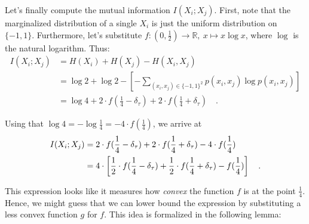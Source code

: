 \documentclass[../../main.tex]{subfiles}
\begin{document}
Let's finally compute the mutual information $I(X_i; X_j)$. First, note that the marginalized distribution of a single $X_i$ is just the uniform distribution on $\{-1, 1\}$. Furthermore, let's substitute $f: (0, \frac{1}{2}) \to \mathbb{R}, \ x \mapsto x \log x$, where $\log$ is the natural logarithm. Thus:
\begin{align*}
    I(X_i; X_j) &= H(X_i) + H(X_j) - H(X_i, X_j) \\
    &= \log 2 + \log 2 - \left[ - \sum_{(x_i, x_j) \in \{-1, 1\}^2} p(x_i, x_j) \log p(x_i, x_j) \right] \\
    &= \log 4 + 2 \cdot f(\frac{1}{4} - \delta_\tau) + 2 \cdot f(\frac{1}{4} + \delta_\tau) \quad .
\end{align*}

Using that $\log 4 = - \log \frac{1}{4} = -4 \cdot f(\frac{1}{4})$, we arrive at
\begin{align}
    I(X_i; X_j) &= 2 \cdot f(\frac{1}{4} - \delta_\tau) + 2 \cdot f(\frac{1}{4} + \delta_\tau) -4 \cdot f(\frac{1}{4}) \notag \\
    &= 4 \cdot \left[ \frac{1}{2} \cdot f(\frac{1}{4} - \delta_\tau) + \frac{1}{2} \cdot f(\frac{1}{4} + \delta_\tau) - f(\frac{1}{4}) \right] \quad . \label{eq:mutual_information_in_terms_of_f}
\end{align}

This expression looks like it measures how \emph{convex} the function $f$ is at the point $\frac{1}{4}$. Hence, we might guess that we can lower bound the expression by substituting a less convex function $g$ for $f$. This idea is formalized in the following lemma:
\end{document}
